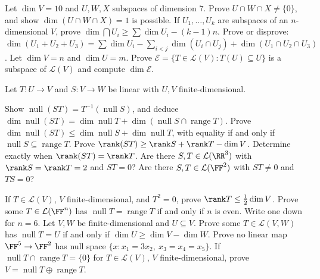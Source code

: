 \documentclass[11pt]{scrartcl}
\DeclareMathOperator{\nul}{null}
\DeclareMathOperator{\range}{range}
\newcommand{\LL}{\mathcal L}
\begin{document}
\begin{problem}
  \leavevmode
  \begin{enumerate}[(a)]
    \ii Let $\dim V=10$ and $U,W,X$ subspaces of dimension $7$.
    Prove $U\cap W\cap X\ne\{0\}$, and show $\dim(U\cap W\cap X)=1$ is possible.
    \ii If $U_1,\dots,U_k$ are subspaces of an $n$-dimensional $V$, prove $\dim\bigcap U_i\ge\sum\dim U_i-(k-1)n$.
    \ii Prove or disprove: $\dim(U_1+U_2+U_3)=\sum\dim U_i-\sum_{i<j}\dim(U_i\cap U_j)+\dim(U_1\cap U_2\cap U_3)$.
    \ii Let $\dim V=n$ and $\dim U=m$.
    Prove $\mathcal E=\{T\in\LL(V):T(U)\subseteq U\}$ is a subspace of $\LL(V)$ and compute $\dim\mathcal E$.
  \end{enumerate}
\end{problem}

\begin{problem}
  Let $T\colon U\to V$ and $S\colon V\to W$ be linear with $U,V$ finite-dimensional.
  \begin{enumerate}[(a)]
    \ii Show $\nul(ST)=T^{-1}(\nul S)$, and deduce
    $\dim\nul(ST)=\dim\nul T+\dim(\nul S\cap\range T)$.
    \ii Prove $\dim\nul(ST)\le\dim\nul S+\dim\nul T$, with equality if and only if $\nul S\subseteq\range T$.
    \ii Prove $\rank(ST)\ge\rank S+\rank T-\dim V$.
    Determine exactly when $\rank(ST)=\rank T$.
    \ii Are there $S,T\in\LL(\RR^3)$ with $\rank S=\rank T=2$ and $ST=0$?
    Are there $S,T\in\LL(\FF^2)$ with $ST\ne0$ and $TS=0$?
  \end{enumerate}
\end{problem}

\begin{problem}
  \leavevmode
  \begin{enumerate}[(a)]
    \ii If $T\in\LL(V)$, $V$ finite-dimensional, and $T^2=0$, prove $\rank T\le\frac12\dim V$.
    \ii Prove some $T\in\LL(\FF^n)$ has $\nul T=\range T$ if and only if $n$ is even.
    Write one down for $n=6$.
    \ii Let $V,W$ be finite-dimensional and $U\subseteq V$.
    Prove some $T\in\LL(V,W)$ has $\nul T=U$ if and only if $\dim U\ge\dim V-\dim W$.
    \ii Prove no linear map $\FF^5\to\FF^2$ has null space $\{x: x_1=3x_2,\ x_3=x_4=x_5\}$.
    \ii If $\nul T\cap\range T=\{0\}$ for $T\in\LL(V)$, $V$ finite-dimensional, prove $V=\nul T\oplus\range T$.
  \end{enumerate}
\end{problem}
\end{document}
